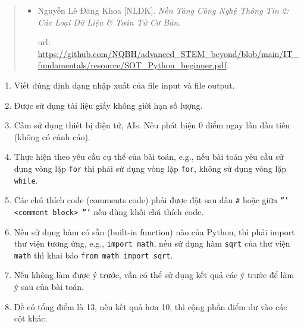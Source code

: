 \documentclass{article}
\begin{document}
\begin{abstract}
\begin{itemize}
\begin{itemize}
            \item Output: \url{https://github.com/NQBH/advanced_STEM_beyond/blob/main/IT_fundamentals/Python/ITF2_midterm_exam_2025_solution.out}.
            
            \item Python: \url{https://github.com/NQBH/advanced_STEM_beyond/blob/main/IT_fundamentals/Python/ITF2_midterm_exam_2025_solution.py}.
        \end{itemize}
        
        \item {\sc Nguyễn Lê Đăng Khoa [NLDK]}. {\it Nền Tảng Công Nghệ Thông Tin 2: Các Loại Dữ Liệu \& Toán Tử Cơ Bản}.
        
        {\sc url}: \url{https://github.com/NQBH/advanced_STEM_beyond/blob/main/IT_fundamentals/resource/SOT_Python_beginner.pdf}.
    \end{itemize}
\end{abstract}
\begin{enumerate}
	\item Viết đúng định dạng nhập xuất của file input và file output.
	\item Được sử dụng tài liệu giấy không giới hạn số lượng.
	\item Cấm sử dụng thiết bị điện tử, AIs. Nếu phát hiện 0 điểm ngay lần đầu tiên (không có cảnh cáo).
	\item Thực hiện theo yêu cầu cụ thể của bài toán, e.g., nếu bài toán yêu cầu sử dụng vòng lặp {\tt for} thì phải sử dụng vòng lặp {\tt for}, không sử dụng vòng lặp {\tt while}.
	\item Các chú thích code (comments code) phải được đặt sau dấu {\tt\#} hoặc giữa {\tt''' <comment block> '''} nếu dùng khối chú thích code.
	\item Nếu sử dụng hàm có sẵn (built-in function) nào của Python, thì phải import thư viện tương ứng, e.g., {\tt import math}, nếu sử dụng hàm {\tt sqrt} của thư viện {\tt math} thì khai báo {\tt from math import sqrt}.
	\item Nếu không làm được ý trước, vẫn có thể sử dụng kết quả các ý trước để làm ý sau của bài toán.
	\item Đề có tổng điểm là 13, nếu kết quả hơn 10, thì cộng phần điểm dư vào các cột khác.
\end{enumerate}
\end{document}
